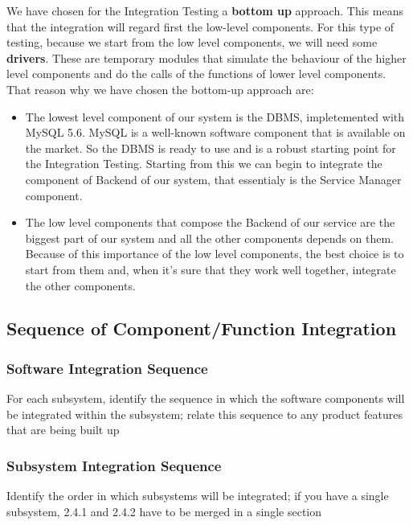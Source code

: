 We have chosen for the Integration Testing a \textbf{bottom up} approach. This means that the integration will regard first the low-level components. For this type of testing, because we start from the low level components, we will need some \textbf{drivers}. These are temporary modules that simulate the behaviour of the higher level components and do the calls of the functions of lower level components. \newline
That reason why we have chosen the bottom-up approach are:

\begin{itemize}
\item The lowest level component of our system is the DBMS, impletemented with MySQL 5.6. MySQL is a well-known software component that is available on the market. So the DBMS is ready to use and is a robust starting point for the Integration Testing. Starting from this we can begin to integrate the component of Backend of our system, that essentialy is the Service Manager component. 
\item The low level components that compose the Backend of our service are the biggest part of our system and all the other components depends on them. Because of this importance of the low level components, the best choice is to start from them and, when it's sure that they work well together, integrate the other components.
\end{itemize}  


\subsection{Sequence of Component/Function Integration} 
\subsubsection{Software Integration Sequence} For each subsystem, identify the sequence in which the software components will be integrated within the subsystem; relate this sequence to any product features that are being built up
\subsubsection{Subsystem Integration Sequence} Identify the order in which subsystems will be integrated;  if you have a single subsystem, 2.4.1 and 2.4.2 have to be merged in a single section





